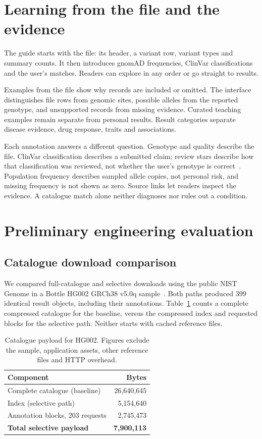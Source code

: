 \documentclass[10pt,twocolumn,letterpaper]{article}
\begin{document}
\section{Learning from the file and the evidence}
The guide starts with the file: its header, a variant row, variant types and summary counts. It then introduces gnomAD frequencies, ClinVar classifications and the user's matches. Readers can explore in any order or go straight to results.

Examples from the file show why records are included or omitted. The interface distinguishes file rows from genomic sites, possible alleles from the reported genotype, and unsupported records from missing evidence. Curated teaching examples remain separate from personal results. Result categories separate disease evidence, drug response, traits and associations.

Each annotation answers a different question. Genotype and quality describe the file. ClinVar classification describes a submitted claim; review stars describe how that classification was reviewed, not whether the user's genotype is correct~\cite{review}. Population frequency describes sampled allele copies, not personal risk, and missing frequency is not shown as zero. Source links let readers inspect the evidence. A catalogue match alone neither diagnoses nor rules out a condition.

\section{Preliminary engineering evaluation}
\label{sec:evaluation}
\subsection{Catalogue download comparison}
We compared full-catalogue and selective downloads using the public NIST Genome in a Bottle HG002 GRCh38 v5.0q sample~\cite{hg002}. Both paths produced 399 identical result objects, including their annotations. Table~\ref{tab:transfer} counts a complete compressed catalogue for the baseline, versus the compressed index and requested blocks for the selective path. Neither starts with cached reference files.

\begin{table}[t]
\caption{Catalogue payload for HG002. Figures exclude the sample, application assets, other reference files and HTTP overhead.}
\label{tab:transfer}
\centering\small
\begin{tabularx}{\columnwidth}{@{}Xr@{}}
\toprule
\textbf{Component} & \textbf{Bytes}\\
\midrule
Complete catalogue (baseline) & 26,640,645\\
Index (selective path) & 5,154,640\\
Annotation blocks, 203 requests & 2,745,473\\
\textbf{Total selective payload} & \textbf{7,900,113}\\
\bottomrule
\end{tabularx}
\end{table}
\end{document}
